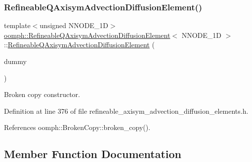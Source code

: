 \subsubsection{\texorpdfstring{Refineable\+Q\+Axisym\+Advection\+Diffusion\+Element()}{RefineableQAxisymAdvectionDiffusionElement()}\hspace{0.1cm}{\footnotesize\ttfamily [2/2]}}
{\footnotesize\ttfamily template$<$unsigned N\+N\+O\+D\+E\+\_\+1D$>$ \\
\hyperlink{classoomph_1_1RefineableQAxisymAdvectionDiffusionElement}{oomph\+::\+Refineable\+Q\+Axisym\+Advection\+Diffusion\+Element}$<$ N\+N\+O\+D\+E\+\_\+1D $>$\+::\hyperlink{classoomph_1_1RefineableQAxisymAdvectionDiffusionElement}{Refineable\+Q\+Axisym\+Advection\+Diffusion\+Element} (\begin{DoxyParamCaption}\item[{const \hyperlink{classoomph_1_1RefineableQAxisymAdvectionDiffusionElement}{Refineable\+Q\+Axisym\+Advection\+Diffusion\+Element}$<$ N\+N\+O\+D\+E\+\_\+1D $>$ \&}]{dummy }\end{DoxyParamCaption})\hspace{0.3cm}{\ttfamily [inline]}}



Broken copy constructor. 



Definition at line 376 of file refineable\+\_\+axisym\+\_\+advection\+\_\+diffusion\+\_\+elements.\+h.



References oomph\+::\+Broken\+Copy\+::broken\+\_\+copy().



\subsection{Member Function Documentation}
\mbox{\label{classoomph_1_1RefineableQAxisymAdvectionDiffusionElement_a876b090aa3813d3837218a5aecb64404}} 
